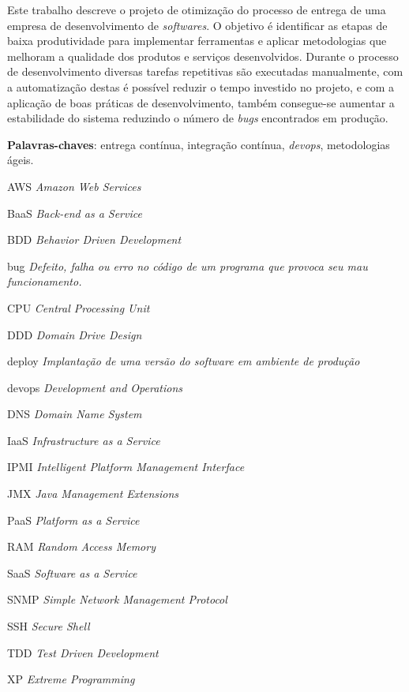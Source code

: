 \documentclass[
12pt,				%
openright,			%
oneside,			%
a4paper,			%
english,			%
french,				%
spanish,			%
brazil,				%
]{abntex2}
\begin{document}
\setlength{\absparsep}{18pt} %
\begin{resumo}
	Este trabalho descreve o projeto de otimização do processo de entrega de uma empresa de desenvolvimento de \textit{softwares}. O objetivo é identificar as etapas de baixa produtividade para implementar ferramentas e aplicar metodologias que melhoram a qualidade dos produtos e serviços desenvolvidos. Durante o processo de desenvolvimento diversas tarefas repetitivas são executadas manualmente, com a automatização destas é possível reduzir o tempo investido no projeto, e com a aplicação de boas práticas de desenvolvimento, também consegue-se aumentar a estabilidade do sistema reduzindo o número de \textit{bugs} encontrados em produção.
	
	\noindent
	\textbf{Palavras-chaves}: entrega contínua, integração contínua, \textit{devops}, metodologias ágeis.
\end{resumo}


\listoftables*

\begin{siglas}
	\item[AWS] \textit{Amazon Web Services}
	\item[BaaS] \textit{Back-end as a Service}
	\item[BDD] \textit{Behavior Driven Development}
	\item[bug] \textit{Defeito, falha ou erro no código de um programa que provoca seu mau funcionamento.}
	\item[CPU] \textit{Central Processing Unit}
	\item[DDD] \textit{Domain Drive Design}
	\item[deploy] \textit{Implantação de uma versão do software em ambiente de produção}
	\item[devops] \textit{Development and Operations}
	\item[DNS] \textit{Domain Name System}
	\item[IaaS] \textit{Infrastructure as a Service}
	\item[IPMI] \textit{Intelligent Platform Management Interface}
	\item[JMX] \textit{Java Management Extensions}
	\item[PaaS] \textit{Platform as a Service}
	\item[RAM] \textit{Random Access Memory}
	\item[SaaS] \textit{Software as a Service}
	\item[SNMP] \textit{Simple Network Management Protocol}
	\item[SSH] \textit{Secure Shell}
	\item[TDD] \textit{Test Driven Development}
	\item[XP] \textit{Extreme Programming}
\end{siglas}
\end{document}
